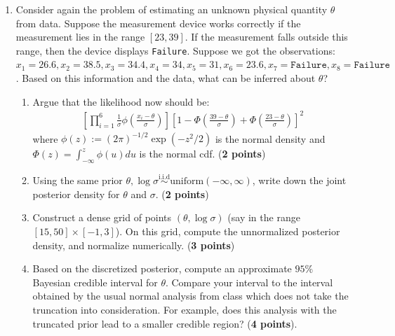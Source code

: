 \documentclass{scrartcl}
\begin{document}
\begin{enumerate}
\item Consider again the problem of estimating an unknown physical 
  quantity $\theta$ from data. Suppose the measurement device works
  correctly if the measurement lies in the range $[23, 39]$. If the
  measurement  falls outside this range, then the device displays
  \texttt{Failure}. Suppose we got the observations: $x_1 = 26.6, x_2 = 38.5, x_3 = 34.4,
  x_4 = 34, x_5 = 31, x_6 = 23.6, x_7 = \texttt{Failure}, x_8 =
  \texttt{Failure}$. Based on this information and the data, what can
  be inferred   about $\theta$?
\begin{enumerate}
\item Argue that the likelihood now should be: 
  \begin{align*}
\left[    \prod_{i=1}^6\frac{1}{\sigma}
    \phi\left(\frac{x_i-\theta}{\sigma} \right) \right] \left[1 -
    \Phi\left(\frac{39 - \theta}{\sigma} \right) +  \Phi\left(\frac{23
    - \theta}{\sigma} \right) \right]^2
  \end{align*}
  where $\phi(z) := (2 \pi)^{-1/2}\exp(-z^2/2)$ is the normal density
  and $\Phi(z) = \int_{-\infty}^z \phi(u) du$ is the normal
  cdf. (\textbf{2 points})
\item Using the same prior $\theta, \log \sigma
  \overset{\text{i.i.d}}{\sim} \text{uniform}(-\infty, \infty)$, write
  down the joint posterior density for $\theta$ and
  $\sigma$. (\textbf{2 points})
\item Construct a dense grid of points $(\theta, \log \sigma)$ (say in
  the range $[15, 50] \times [-1, 3]$). On this grid, compute the
  unnormalized posterior density, and normalize
  numerically. (\textbf{3 points})
\item Based on the discretized posterior, compute an approximate
  $95\%$ Bayesian credible interval for $\theta$. Compare your
  interval to the interval obtained by the usual normal analysis from
  class which does not take the truncation into consideration. For
  example, does this analysis with the truncated prior lead to a
  smaller credible region? (\textbf{4 points}). 
\end{enumerate}


  


\end{enumerate}
\end{document}
